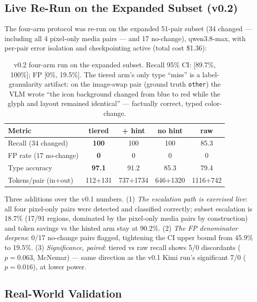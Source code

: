 \documentclass[10pt,twocolumn,letterpaper]{article}
\begin{document}
\subsection{Live Re-Run on the Expanded Subset (v0.2)\label{sec:v02rerun}}

The four-arm protocol was re-run on the expanded 51-pair subset (34 changed — including all 4 pixel-only media pairs — and 17 no-change), qwen3.8-max, with per-pair error isolation and checkpointing active (total cost \$1.36):

\begin{table}[h]
\centering
\small
\begin{tabular}{lcccc}
\toprule
\textbf{Metric} & \textbf{tiered} & \textbf{+ hint} & \textbf{no hint} & \textbf{raw} \\
\midrule
Recall (34 changed) & \textbf{100} & 100 & 100 & 85.3 \\
FP rate (17 no-change) & \textbf{0} & 0 & 0 & 0 \\
Type accuracy & \textbf{97.1} & 91.2 & 85.3 & 79.4 \\
Tokens/pair (in+out) & 112+131 & 737+1734 & 646+1320 & 1116+742 \\
\bottomrule
\end{tabular}
\caption{v0.2 four-arm run on the expanded subset. Recall 95\% CI: [89.7\%, 100\%]; FP [0\%, 19.5\%]. The tiered arm's only type ``miss'' is a label-granularity artifact: on the image-swap pair (ground truth \texttt{other}) the VLM wrote ``the icon background changed from blue to red while the glyph and layout remained identical'' — factually correct, typed color-change.}
\label{tab:v02}
\end{table}

Three additions over the v0.1 numbers. (1) \textit{The escalation path is exercised live}: all four pixel-only pairs were detected and classified correctly; subset escalation is 18.7\% (17/91 regions, dominated by the pixel-only media pairs by construction) and token savings vs the hinted arm stay at 90.2\%. (2) \textit{The FP denominator deepens}: 0/17 no-change pairs flagged, tightening the CI upper bound from 45.9\% to 19.5\%. (3) \textit{Significance, paired}: tiered vs raw recall shows 5/0 discordants ($p=0.063$, McNemar) — same direction as the v0.1 Kimi run's significant 7/0 ($p=0.016$), at lower power.

\subsection{Real-World Validation\label{sec:realworld}}
\end{document}
